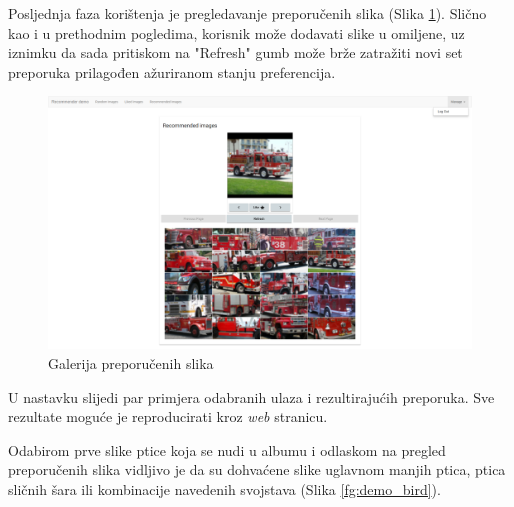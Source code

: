 \documentclass[times, utf8, proizvoljni, numeric]{fer}
\begin{document}
Posljednja faza korištenja je pregledavanje preporučenih slika (Slika \ref{fg:demo_recommended}). Slično kao i u prethodnim pogledima, korisnik može dodavati slike u omiljene, uz iznimku da sada pritiskom na "Refresh" gumb može brže zatražiti novi set preporuka prilagođen ažuriranom stanju preferencija. 

\begin{figure}[H]
	\begin{center}
		\captionsetup{justification=centering}
		\includegraphics[width=1.0\textwidth]{./imgs/demo-preporucitelja-po-sadrzaju/tijek-rada/demo-reco.png}
		\caption{Galerija preporučenih slika}
		\label{fg:demo_recommended}
	\end{center}
\end{figure}


U nastavku slijedi par primjera odabranih ulaza i rezultirajućih preporuka. Sve rezultate moguće je reproducirati kroz \textit{web} stranicu. 

Odabirom prve slike ptice koja se nudi u albumu i odlaskom na pregled preporučenih slika vidljivo je da su dohvaćene slike uglavnom manjih ptica, ptica sličnih šara ili kombinacije navedenih svojstava (Slika \ref{fg:demo_bird}). 
\end{document}
